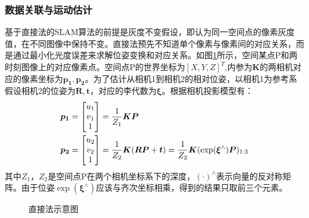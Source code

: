 \subsubsection*{数据关联与运动估计}
基于直接法的SLAM算法的前提是灰度不变假设，即认为同一空间点的像素灰度值，在不同图像中保持不变。直接法预先不知道单个像素与像素间的对应关系，而是通过最小化光度误差来求解位姿变换和对应关系。如图\ref{fig3.5}所示，空间某点P和两时刻图像上的对应像素点。空间点P的世界坐标为$[X,Y,Z]^T$,内参为$\boldsymbol{K}$的两相机对应的像素坐标为$\boldsymbol{p_1},\boldsymbol{p_2}$。为了估计从相机1到相机2的相对位姿，以相机1为参考系假设相机2的位姿为$\boldsymbol{R},\boldsymbol{t}$，对应的李代数为$\boldsymbol{\xi}$。根据相机投影模型有：
\begin{equation}
\label{equ3.8}
\begin{aligned}
& \boldsymbol{p_1} = 
\begin{bmatrix}
u_1 \cr v_1 \cr 1 \cr 
\end{bmatrix}
={1 \over Z_1} \boldsymbol{K} \boldsymbol{P}
\\
& \boldsymbol{p_2} = 
\begin{bmatrix}
u_2 \cr v_2 \cr 1 \cr
\end{bmatrix}
={1 \over Z_2} \boldsymbol{K} ( \boldsymbol{R} \boldsymbol{P}+\boldsymbol{t}) = {1 \over Z_2} \boldsymbol{K} ( \exp (\boldsymbol{\xi}^{\wedge}) \boldsymbol{P})_{1:3}
\end{aligned}
\end{equation}
其中$Z_1$，$Z_2$是空间点P在两个相机坐标系下的深度，$(\cdot)^{\wedge}$表示向量的反对称矩阵。由于位姿$\exp(\boldsymbol{\xi}^{\wedge})$应该与齐次坐标相乘，得到的结果只取前三个元素。
\begin{figure}
\centering
\caption{直接法示意图}
\label{fig3.5}
\end{figure}

